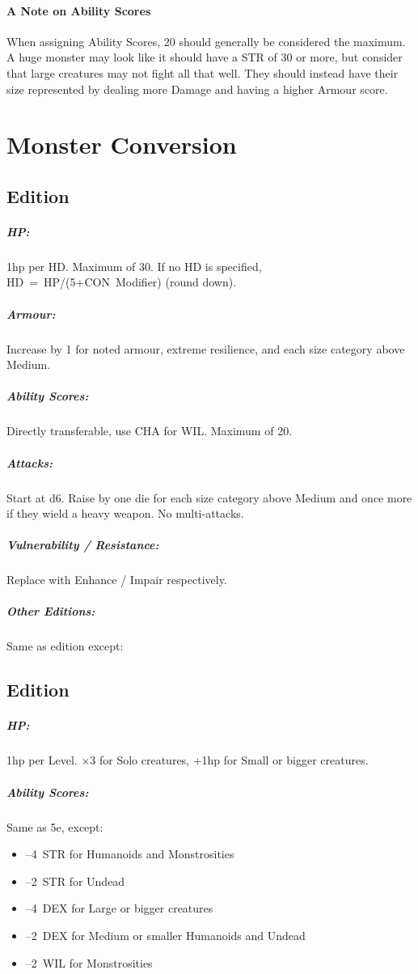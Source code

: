 \documentclass[itdr/core]{subfiles}
\begin{document}
\vfill
{}
\paragraph{A Note on Ability Scores}
When assigning Ability Scores, 20 should generally be considered the maximum. A huge monster may look like it should have a STR of 30 or more, but consider that large creatures may not fight all that well. They should instead have their size represented by dealing more Damage and having a higher Armour score.

\vfill
\break

\section{Monster Conversion}

\subsection*{ Edition}

\subparagraph{HP:} 1hp per HD. Maximum of 30. If no HD is specified, HD~=~HP/(5+CON~Modifier) (round down).
\subparagraph{Armour:} Increase by 1 for noted armour, extreme resilience, and each size category above Medium.
\subparagraph{Ability Scores:} Directly transferable, use CHA for WIL. Maximum of 20.
\subparagraph{Attacks:} Start at d6. Raise by one die for each size category above Medium and once more if they wield a heavy weapon. No multi-attacks.
\subparagraph{Vulnerability / Resistance:} Replace with Enhance / Impair respectively.

\vfill

\subparagraph{Other Editions:} Same as  edition except:
\subsection*{ Edition}
\subparagraph{HP:} 1hp per Level. $\times$3 for Solo creatures, +1hp for Small or bigger creatures.
\subparagraph{Ability Scores:} Same as 5e, except:
\begin{itemize}
	\item --4~STR for Humanoids and Monstrosities
	\item --2~STR for Undead
	\item --4~DEX for Large or bigger creatures
	\item --2~DEX for Medium or smaller Humanoids and Undead
	\item --2~WIL for Monstrosities
\end{itemize}
\end{document}
